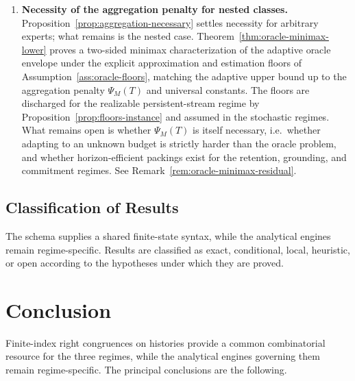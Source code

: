 \documentclass[12pt]{article}
\theoremstyle{definition}
\newcommand{\PsiAgg}{\Psi}
\begin{document}
\begin{enumerate}[leftmargin=2.0em]
\item \textbf{Necessity of the aggregation penalty for nested classes.}
Proposition~\ref{prop:aggregation-necessary} settles necessity for arbitrary
experts; what remains is the nested case.
Theorem~\ref{thm:oracle-minimax-lower} proves a two-sided minimax
characterization of the adaptive oracle envelope under the explicit
approximation and estimation floors of
Assumption~\ref{ass:oracle-floors}, matching the adaptive upper bound up to
the aggregation penalty $\PsiAgg_M(T)$ and universal constants.  The floors are
discharged for the realizable persistent-stream regime by
Proposition~\ref{prop:floors-instance} and assumed in the stochastic regimes.
What remains open is whether $\PsiAgg_M(T)$ is itself necessary, i.e.\ whether
adapting to an unknown budget is strictly harder than the oracle problem, and
whether horizon-efficient packings exist for the retention, grounding, and
commitment regimes.  See Remark~\ref{rem:oracle-minimax-residual}.
\end{enumerate}

\subsection{Classification of Results}
\label{subsec:final-epistemic}

The schema supplies a shared finite-state syntax, while the analytical engines
remain regime-specific.  Results are classified as exact, conditional, local,
heuristic, or open according to the hypotheses under which they are proved.

\section{Conclusion}
\label{sec:conclusion}

Finite-index right congruences on histories provide a common combinatorial
resource for the three regimes, while the analytical engines governing them
remain regime-specific.  The principal conclusions are the following.
\end{document}
